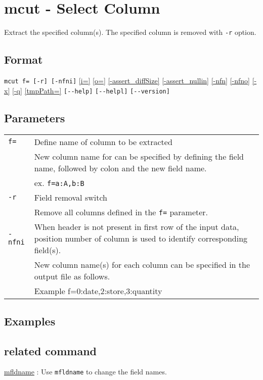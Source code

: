 
%

\section{mcut - Select Column\label{sect:mcut}}
Extract the specified column(s). 
The specified column is removed with \verb|-r| option. 

\subsection*{Format}
\verb|mcut f= [-r] [-nfni]|
\hyperref[sect:option_i]{[i=]}
\hyperref[sect:option_o]{[o=]}
\hyperref[sect:option_assert_diffSize]{[-assert\_diffSize]}
\hyperref[sect:option_assert_nullin]{[-assert\_nullin]}
\hyperref[sect:option_nfn]{[-nfn]} 
\hyperref[sect:option_nfno]{[-nfno]}  
\hyperref[sect:option_x]{[-x]}
\hyperref[sect:option_q]{[-q]}
\hyperref[sect:option_option_tmppath]{[tmpPath=]}
\verb|[--help]|
\verb|[--helpl]|
\verb|[--version]|\\

\subsection*{Parameters}
\begin{table}[htbp]
{\small
\begin{tabular}{ll}
\verb|f=|    & Define name of column to be extracted  \\
             & New column name for can be specified by defining the field name, followed by colon and the new field name. \\
             & ex. \verb|f=a:A,b:B| \\
\verb|-r|    & Field removal switch \\
             & Remove all columns defined in the \verb|f=| parameter.\\
\verb|-nfni| & When header is not present in first row of the input data, position number of column is used to identify corresponding field(s). \\
             & New column name(s) for each column can be specified in the output file as follows. \\
             & Example f=0:date,2:store,3:quantity \\
\end{tabular} 
}
\end{table} 


\subsection*{Examples}


\subsection*{related command}
\hyperref[sect:mfldname]{mfldname} : Use \verb|mfldname| to change the field names. 

%
